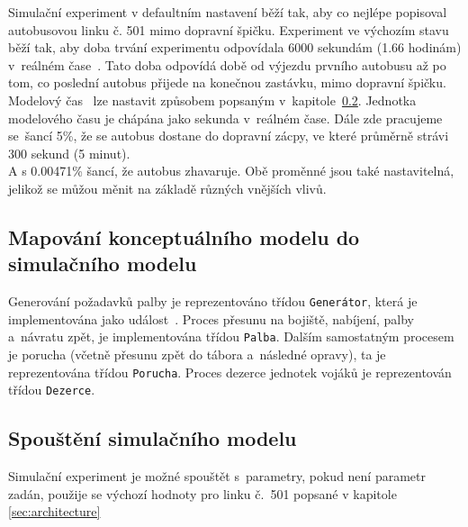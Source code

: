 \documentclass[a4paper]{article}
\begin{document}
        Simulační experiment v defaultním nastavení běží tak, aby co nejlépe popisoval autobusovou linku č. 501 mimo dopravní špičku.
        Experiment ve výchozím stavu běží tak, aby doba trvání experimentu odpovídala 6000 sekundám (1.66 hodinám) v~reálném čase~\cite[snímek 21]{IMS_slides}. Tato doba odpovídá době od výjezdu prvního autobusu až po tom, co poslední autobus přijede na konečnou zastávku, mimo dopravní špičku.
        Modelový čas~\cite[snímek 21]{IMS_slides} lze nastavit způsobem popsaným v~kapitole~\ref{subsec:start}. Jednotka modelového času je chápána jako
        sekunda v~reálném čase.
        Dále zde pracujeme se~šancí 5\%, že se autobus dostane do dopravní zácpy, ve které průměrně strávi 300 sekund (5 minut).\\ A s 0.00471\% šancí, že autobus zhavaruje. Obě proměnné jsou také nastavitelná, jelikož se můžou měnit na základě různých vnějších vlivů.

        \subsection{Mapování konceptuálního modelu do simulačního modelu}
        \label{subsec:mapping}

            Generování požadavků palby je reprezentováno třídou \texttt{Generátor}, která je implementována jako
            událost~\cite[snímek 169]{IMS_slides}. Proces přesunu na bojiště, nabíjení, palby a~návratu zpět, je 
            implementována třídou \texttt{Palba}. Dalším samostatným procesem je porucha (včetně přesunu zpět do tábora a~následné opravy),
            ta je reprezentována třídou \texttt{Porucha}. Proces dezerce jednotek vojáků je reprezentován třídou \texttt{Dezerce}.

        \subsection{Spouštění simulačního modelu}
        \label{subsec:start}

            Simulační experiment je možné spouštět s~parametry, pokud není parametr zadán, použije se výchozí hodnoty pro linku č.~501 popsané v kapitole \ref{sec:architecture}
            
\end{document}
